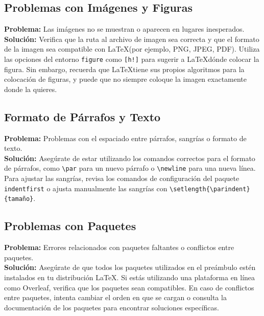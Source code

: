 \documentclass[11pt]{article}
\begin{document}
\subsection{Problemas con Imágenes y Figuras}

\textbf{Problema:} Las imágenes no se muestran o aparecen en lugares inesperados.\\

\textbf{Solución:} Verifica que la ruta al archivo de imagen sea correcta y que el formato de la imagen sea compatible con \LaTeX (por ejemplo, PNG, JPEG, PDF). Utiliza las opciones del entorno \texttt{figure} como \texttt{[h!]} para sugerir a \LaTeX dónde colocar la figura. Sin embargo, recuerda que \LaTeX tiene sus propios algoritmos para la colocación de figuras, y puede que no siempre coloque la imagen exactamente donde la quieres.

\subsection{Formato de Párrafos y Texto}

\textbf{Problema:} Problemas con el espaciado entre párrafos, sangrías o formato de texto.\\

\textbf{Solución:} Asegúrate de estar utilizando los comandos correctos para el formato de párrafos, como \texttt{\textbackslash par} para un nuevo párrafo o \texttt{\textbackslash newline} para una nueva línea. Para ajustar las sangrías, revisa los comandos de configuración del paquete \texttt{indentfirst} o ajusta manualmente las sangrías con \texttt{\textbackslash setlength\{\textbackslash parindent\}\{tamaño\}}.

\subsection{Problemas con Paquetes}

\textbf{Problema:} Errores relacionados con paquetes faltantes o conflictos entre paquetes.\\

\textbf{Solución:} Asegúrate de que todos los paquetes utilizados en el preámbulo estén instalados en tu distribución \LaTeX. Si estás utilizando una plataforma en línea como Overleaf, verifica que los paquetes sean compatibles. En caso de conflictos entre paquetes, intenta cambiar el orden en que se cargan o consulta la documentación de los paquetes para encontrar soluciones específicas.\\
\end{document}
